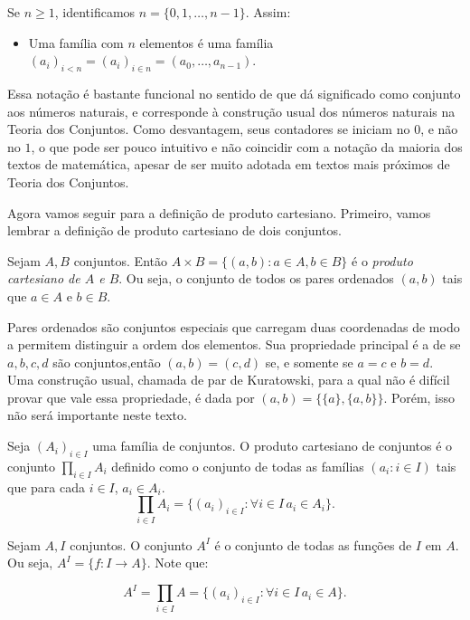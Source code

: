 \begin{exemplo}
    Se $n\geq 1$, identificamos $n=\{0, 1, \dots, n-1\}$.
    Assim:
    \begin{itemize}
    \item Uma família com $n$ elementos é uma família $(a_i)_{i<n}=(a_i)_{i \in n}=(a_0, \dots, a_{n-1})$.
    \end{itemize}

    Essa notação é bastante funcional no sentido de que dá significado como conjunto aos números naturais, e corresponde à construção usual dos números naturais na Teoria dos Conjuntos.
    Como desvantagem, seus contadores se iniciam no $0$, e não no $1$, o que pode ser pouco intuitivo e não coincidir com a notação da maioria dos textos de matemática, apesar de ser muito adotada em textos mais próximos de Teoria dos Conjuntos.
\end{exemplo}

Agora vamos seguir para a definição de produto cartesiano.
Primeiro, vamos lembrar a definição de produto cartesiano de dois conjuntos.

\begin{definition}
    Sejam $A, B$ conjuntos. Então $A\times B=\{(a, b): a\in A, b \in B\}$ é o \emph{produto cartesiano de $A$ e $B$}.
    Ou seja, o conjunto de todos os pares ordenados $(a, b)$ tais que $a\in A$ e $b\in B$.
\end{definition}

Pares ordenados são conjuntos especiais que carregam duas coordenadas de modo a permitem distinguir a ordem dos elementos.
Sua propriedade principal é a de se $a, b, c, d$ são conjuntos,então $(a, b)=(c, d)$ se, e somente se $a=c$ e $b=d$.
Uma construção usual, chamada de par de Kuratowski, para a qual não é difícil provar que vale essa propriedade, é dada por $(a, b)=\{\{a\}, \{a, b\}\}$. Porém, isso não será importante neste texto.


\begin{definition}
Seja $(A_i)_{i \in I}$ uma família de conjuntos.
O produto cartesiano de conjuntos é o conjunto $\prod_{i \in I} A_i$ definido como o conjunto de todas as famílias $(a_i: i \in I)$ tais que para cada $i \in I$, $a_i \in A_i$.
\[\prod_{i \in I} A_i=\{(a_i)_{i \in I}: \forall i \in I\, a_i \in A_i\}.\]
\end{definition}


\begin{definition}
    Sejam $A, I$ conjuntos.
    O conjunto $A^I$ é o conjunto de todas as funções de $I$ em $A$. Ou seja, $A^I=\{f:I\rightarrow A\}$.
    Note que:

    \[A^I=\prod_{i \in I}A=\{(a_i)_{i \in I}: \forall i \in I\,  a_i\in A\}.\]
    \end{definition}

